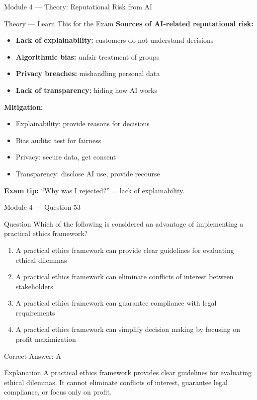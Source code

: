 \documentclass[aspectratio=169,10pt]{beamer}
\newcommand{\question}[1]{%
	\begin{block}{Question}
		#1
	\end{block}
}
\newcommand{\options}[4]{%
	\begin{enumerate}[label=\Alph*.,leftmargin=*]
		\item #1
		\item #2
		\item #3
		\item #4
	\end{enumerate}
}
\newcommand{\answerbox}[1]{%
	\begin{exampleblock}{Correct Answer: #1}
	\end{exampleblock}
}
\newcommand{\explain}[1]{%
	\begin{block}{Explanation}
		\small #1
	\end{block}
}
\newcommand{\theory}[1]{%
	\begin{block}{Theory --- Learn This for the Exam}
		\small #1
	\end{block}
}
\begin{document}
	\begin{frame}{Module 4 --- Theory: Reputational Risk from AI}
		\theory{
			\textbf{Sources of AI-related reputational risk:}
			\begin{itemize}
				\item \textbf{Lack of explainability:} customers do not understand decisions
				\item \textbf{Algorithmic bias:} unfair treatment of groups
				\item \textbf{Privacy breaches:} mishandling personal data
				\item \textbf{Lack of transparency:} hiding how AI works
			\end{itemize}
			\textbf{Mitigation:}
			\begin{itemize}
				\item Explainability: provide reasons for decisions
				\item Bias audits: test for fairness
				\item Privacy: secure data, get consent
				\item Transparency: disclose AI use, provide recourse
			\end{itemize}
			\textbf{Exam tip:} ``Why was I rejected?'' = lack of explainability.
		}
	\end{frame}
	
	\begin{frame}{Module 4 --- Question 53}
		\question{Which of the following is considered an advantage of implementing a practical ethics framework?}
		\options{A practical ethics framework can provide clear guidelines for evaluating ethical dilemmas}{A practical ethics framework can eliminate conflicts of interest between stakeholders}{A practical ethics framework can guarantee compliance with legal requirements}{A practical ethics framework can simplify decision making by focusing on profit maximization}
		\answerbox{A}
		\explain{A practical ethics framework provides clear guidelines for evaluating ethical dilemmas. It cannot eliminate conflicts of interest, guarantee legal compliance, or focus only on profit.}
	\end{frame}
	
\end{document}
